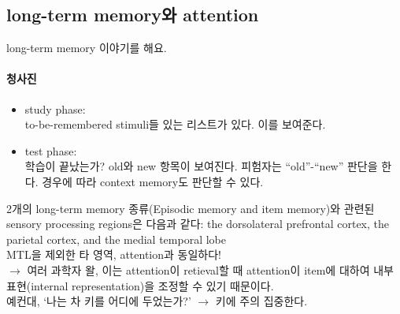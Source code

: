 \documentclass[../note.tex]{subfiles}
\begin{document}

\subsection{long-term memory와 attention}
long-term memory 이야기를 해요.

\paragraph{청사진}
\begin{itemize}
  \item study phase:\\
    to-be-remembered stimuli들 있는 리스트가 있다. 이를 보여준다.
  \item test phase:\\
    학습이 끝났는가? old와 new 항목이 보여진다. 피험자는 ``old''-``new'' 판단을 한다. 경우에 따라 context memory도 판단할 수 있다.
\end{itemize}

2개의 long-term memory 종류(Episodic memory and item memory)와 관련된 sensory processing regions은 다음과 같다:
the dorsolateral prefrontal cortex, the parietal cortex, and the medial temporal lobe\\
MTL을 제외한 타 영역, attention과 동일하다!\\
$\longrightarrow$ 여러 과학자 왈, 이는 attention이 retieval할 때 attention이 item에 대하여 내부 표현(internal representation)을 조정할 수 있기 때문이다.\\
예컨대, `나는 차 키를 어디에 두었는가?' $\longrightarrow$ 키에 주의 집중한다.\\
\end{document}
